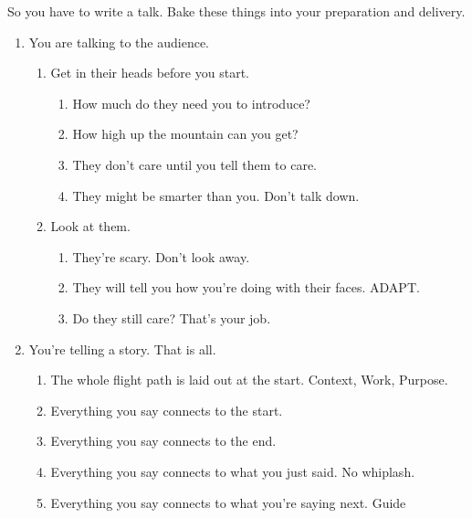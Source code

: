 \documentclass[fleqn,usenatbib,useAMS]{mnras}
\begin{document}
\maketitle
%

So you have to write a talk.  Bake these things into your preparation and
delivery.

\begin{enumerate}
    \item You are talking to the audience.
        \begin{enumerate}
            \item Get in their heads before you start.
                \begin{enumerate}
                    \item How much do they need you to introduce?
                    \item How high up the mountain can you get?
                    \item They don't care until you tell them to care.
                    \item They might be smarter than you.  Don't talk down.
                \end{enumerate}
            \item Look at them.
                \begin{enumerate}
                    \item They're scary.  Don't look away.
                    \item They will tell you how you're doing with their faces.
                        ADAPT.
                    \item Do they still care?  That's your job.
                \end{enumerate}
        \end{enumerate}
    \item You're telling a story. That is all.
        \begin{enumerate}
            \item The whole flight path is laid out at the start.  Context,
                Work, Purpose.
            \item Everything you say connects to the start.  
            \item Everything you say connects to the end.
            \item Everything you say connects to what you just said.  No
                whiplash.
            \item Everything you say connects to what you're saying next.  Guide

\end{enumerate}
\end{enumerate}
\end{document}
